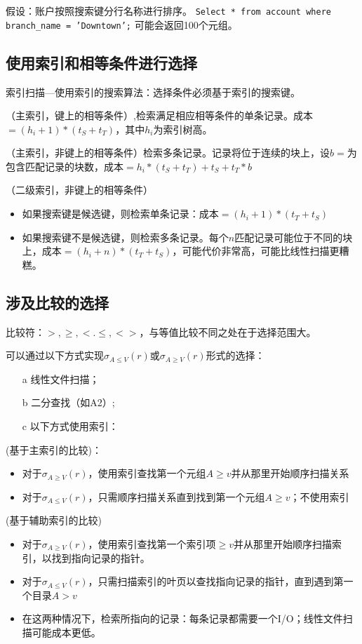 假设：账户按照搜索键分行名称进行排序。
\texttt{Select * from account where branch\_name = 'Downtown';}
可能会返回100个元组。

\subsection{使用索引和相等条件进行选择}

索引扫描---使用索引的搜索算法：选择条件必须基于索引的搜索键。

（主索引，键上的相等条件）,检索满足相应相等条件的单条记录。成本$=(h_i+1)*(t_S+t_T)$，其中$h_i$为索引树高。

（主索引，非键上的相等条件）检索多条记录。记录将位于连续的块上，设$b=$为包含匹配记录的块数，成本$=h_i*(t_S+t_T)+t_S+t_T*b$

（二级索引，非键上的相等条件）
\begin{itemize}
    \item 如果搜索键是候选键，则检索单条记录：成本$=(h_i+1)*(t_T+t_S)$
    \item 如果搜索键不是候选键，则检索多条记录。每个$n$匹配记录可能位于不同的块上，成本$=(h_i+n)*(t_T+t_S)$，可能代价非常高，可能比线性扫描更糟糕。
\end{itemize}

\subsection{涉及比较的选择}

比较符：$>,\geq,<.\leq,<>$，与等值比较不同之处在于选择范围大。

可以通过以下方式实现$\sigma_{A\leq V}(r)$或$\sigma_{A\geq V}(r)$形式的选择：
\begin{itemize}
    \item[a] 线性文件扫描；
    \item[b] 二分查找（如A2）;
    \item[c] 以下方式使用索引：
\end{itemize}

(基于主索引的比较)：
\begin{itemize}
    \item 对于$\sigma_{A\geq V}(r)$，使用索引查找第一个元组$A\geq v$并从那里开始顺序扫描关系
    \item 对于$\sigma_{A\leq V}(r)$，只需顺序扫描关系直到找到第一个元组$A\geq v$；不使用索引
\end{itemize}

(基于辅助索引的比较)
\begin{itemize}
    \item 对于$\sigma_{A\geq V}(r)$，使用索引查找第一个索引项$\geq v$并从那里开始顺序扫描索引，以找到指向记录的指针。
    \item 对于$\sigma_{A\leq V}(r)$，只需扫描索引的叶页以查找指向记录的指针，直到遇到第一个目录$A>v$
    \item 在这两种情况下，检索所指向的记录：每条记录都需要一个I/O；线性文件扫描可能成本更低。
\end{itemize}

